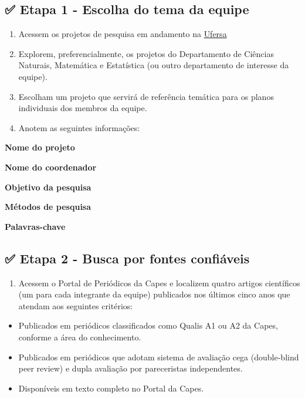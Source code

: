 \documentclass[
  letterpaper,
  DIV=11,
  numbers=noendperiod]{scrreprt}
\providecommand{\tightlist}{%
  \setlength{\itemsep}{0pt}\setlength{\parskip}{0pt}}
\begin{document}
\subsection{✅ Etapa 1 - Escolha do tema da
equipe}\label{etapa-1---escolha-do-tema-da-equipe}

\begin{enumerate}
\def\labelenumi{\arabic{enumi}.}
\item
  Acessem os projetos de pesquisa em andamento na
  \href{https://sigaa.ufersa.edu.br/sigaa/public/pesquisa/consulta_projetos.jsf}{Ufersa}
\item
  Explorem, preferencialmente, os projetos do Departamento de Ciências
  Naturais, Matemática e Estatística (ou outro departamento de interesse
  da equipe).
\item
  Escolham um projeto que servirá de referência temática para os planos
  individuais dos membros da equipe.
\item
  Anotem as seguintes informações:
\end{enumerate}

\textbf{Nome do projeto}

\textbf{Nome do coordenador}

\textbf{Objetivo da pesquisa}

\textbf{Métodos de pesquisa}

\textbf{Palavras-chave}

\subsection{✅ Etapa 2 - Busca por fontes
confiáveis}\label{etapa-2---busca-por-fontes-confiuxe1veis}

\begin{enumerate}
\def\labelenumi{\arabic{enumi}.}
\tightlist
\item
  Acessem o Portal de Periódicos da Capes e localizem quatro artigos
  científicos (um para cada integrante da equipe) publicados nos últimos
  cinco anos que atendam aos seguintes critérios:
\end{enumerate}

\begin{itemize}
\item
  Publicados em periódicos classificados como Qualis A1 ou A2 da Capes,
  conforme a área do conhecimento.
\item
  Publicados em periódicos que adotam sistema de avaliação cega
  (double-blind peer review) e dupla avaliação por pareceristas
  independentes.
\item
  Disponíveis em texto completo no Portal da Capes.
\end{itemize}
\end{document}
